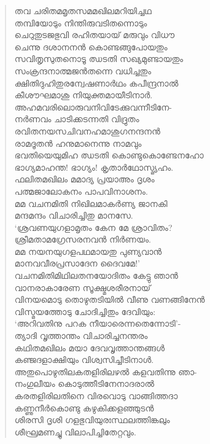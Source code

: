 \begin{verse}
തവ ചരിതമമൃതസമമഖിലമറിയിച്ചഥ\\
തമ്പിയോടും നിന്തിരുവടിതന്നൊടും\\
ചെറുതുടജഭുവി രഹിതയായ് മരുവും വിധൗ\\
ചെന്നു ദശാനനന്‍ കൊണ്ടങ്ങുപോയതും\\
സവിതൃസുതനൊടൂ ഝടതി സഖ്യമുണ്ടായതും\\
സംക്രന്ദനാത്മജന്‍തന്നെ വധിച്ചതും\\
ക്ഷിതിദുഹിതുരന്വേഷണാര്‍ഥം കപീന്ദ്രനാല്‍\\
കീശൗഘമാശു നിയുക്തമായീടിനാര്‍.\\
അഹമവരിലൊരുവനിവിടേക്കുവന്നീടിനേ-\\
നര്‍ണവം ചാടിക്കടന്നതി വിദ്രുതം\\
രവിതനയസചിവനഹമാശുഗനന്ദനന്‍\\
രാമദൂതന്‍ ഹനുമാനെന്നു നാമവും\\
ഭവതിയെയുമിഹ ഝടതി കൊണ്ടുകൊണ്ടേനഹോ\\
ഭാഗ്യമാഹന്ത! ഭാഗ്യം! കൃതാര്‍ഥോസ്മ്യഹം.\\
ഫലിതമഖിലം മമാദ്യ പ്രയാഅം ദൃശം\\
പത്മജാലോകനം പാപവിനാശനം.\\
മമ വചനമിതി നിഖിലമാകര്‍ണ്യ ജാനകി\\
മന്ദമന്ദം വിചാരിച്ചിതു മാനസേ.\\
‘ശ്രവണയുഗളാമൃതം കേന മേ ശ്രാവിതം?\\
ശ്രീമതാമഗ്രേസരനവന്‍ നിര്‍ണയം.\\
മമ നയനയുഗളപഥമായതു പുണ്യവാന്‍\\
മാനവവീരപ്രസാദേന ദൈവമേ!’\\
വചനമിതിമിഥിലതനയോദിതം കേട്ടു ഞാന്‍\\
വാനരാകാരേണ സൂക്ഷ്മശരീരനായ്\\
വിനയമൊടു തൊഴുതടിയില്‍ വീണു വണങ്ങിനേന്‍\\
വിസ്മയത്തോടു ചോദിച്ചിതും ദേവിയും:\\
‘അറിവതിനു പറക നീയാരെന്നതെന്നോടി’-\\
ത്യാദി വൃത്താന്തം വിചാരിച്ചനന്തരം\\
കഥിതമഖിലം മയാ ദേവവൃത്താന്തങ്ങള്‍\\
കഞ്ജദളാക്ഷിയും വിശ്വസിച്ചീടിനാള്‍.\\
അതുപൊഴുതിലകതളിരിലഴല്‍ കളവതിന്നു ഞാ-\\
നംഗുലീയം കൊടുത്തീടിനേനാദരാല്‍\\
കരതളിരിലതിനെ വിരവൊടു വാങ്ങിത്തദാ\\
കണ്ണുനീര്‍കൊണ്ടു കഴുകിക്കളഞ്ഞുടന്‍\\
ശിരസി ദൃശി ഗളഭുവിയുരഃസ്ഥലത്തിങ്കലും\\
ശീഘ്രമണച്ചു വിലാപിച്ചിതേറ്റവും.\\

\end{verse}
